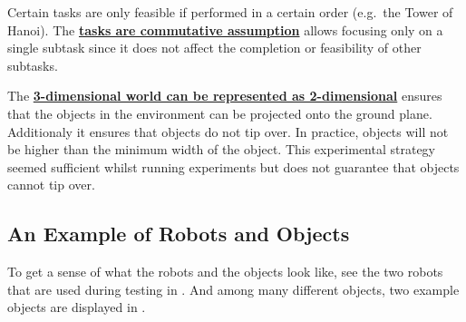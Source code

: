 Certain tasks are only feasible if performed in a certain order (e.g.~the Tower of Hanoi). The \hyperref[assumption:order_does_not_matter]{\textbf{tasks are commutative assumption}} allows focusing only on a single subtask since it does not affect the completion or feasibility of other subtasks.\bs

The \hyperref[assumption:no_tipping]{\textbf{3-dimensional world can be represented as 2-dimensional}} ensures that the objects in the environment can be projected onto the ground plane. Additionaly it ensures that objects do not tip over. In practice, objects will not be higher than the minimum width of the object. This experimental strategy seemed sufficient whilst running experiments but does not guarantee that objects cannot tip over.

\subsection{An Example of Robots and Objects}
To get a sense of what the robots and the objects look like, see the two robots that are used during testing in . And among many different objects, two example objects are displayed in .


